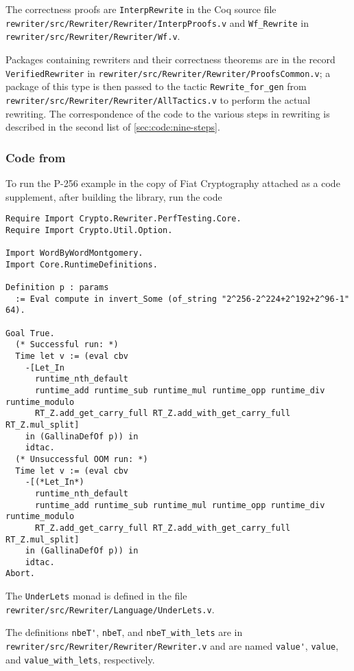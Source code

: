 \documentclass[a4paper,USenglish,cleveref,autoref,thm-restate]{lipics-v2021}
\begin{document}
The correctness proofs are \verb|InterpRewrite| in the Coq source file \texttt{rewriter/src/Rewriter/Rewriter/InterpProofs.v} and \verb|Wf_Rewrite| in \texttt{rewriter/src/Rewriter/Rewriter/Wf.v}.

Packages containing rewriters and their correctness theorems are in the record \verb|VerifiedRewriter| in \texttt{rewriter/src/Rewriter/Rewriter/ProofsCommon.v};
a package of this type is then passed to the tactic \verb|Rewrite_for_gen| from \texttt{rewriter/src/Rewriter/Rewriter/AllTactics.v} to perform the actual rewriting.
The correspondence of the code to the various steps in rewriting is described in the second list of \autoref{sec:code:nine-steps}.

\subsubsection{Code from }

To run the P-256 example in the copy of Fiat Cryptography attached as a code supplement, after building the library, run the code
\begin{verbatim}
Require Import Crypto.Rewriter.PerfTesting.Core.
Require Import Crypto.Util.Option.

Import WordByWordMontgomery.
Import Core.RuntimeDefinitions.

Definition p : params
  := Eval compute in invert_Some (of_string "2^256-2^224+2^192+2^96-1" 64).

Goal True.
  (* Successful run: *)
  Time let v := (eval cbv
    -[Let_In
      runtime_nth_default
      runtime_add runtime_sub runtime_mul runtime_opp runtime_div runtime_modulo
      RT_Z.add_get_carry_full RT_Z.add_with_get_carry_full RT_Z.mul_split]
    in (GallinaDefOf p)) in
    idtac.
  (* Unsuccessful OOM run: *)
  Time let v := (eval cbv
    -[(*Let_In*)
      runtime_nth_default
      runtime_add runtime_sub runtime_mul runtime_opp runtime_div runtime_modulo
      RT_Z.add_get_carry_full RT_Z.add_with_get_carry_full RT_Z.mul_split]
    in (GallinaDefOf p)) in
    idtac.
Abort.
\end{verbatim}

The \verb|UnderLets| monad is defined in the file \texttt{rewriter/src/Rewriter/Language/UnderLets.v}.

The definitions \verb|nbeT'|, \verb|nbeT|, and \verb|nbeT_with_lets| are in \texttt{rewriter/src/Rewriter/Rewriter/Rewriter.v} and are named \verb|value'|, \verb|value|, and \verb|value_with_lets|, respectively.
\end{document}

